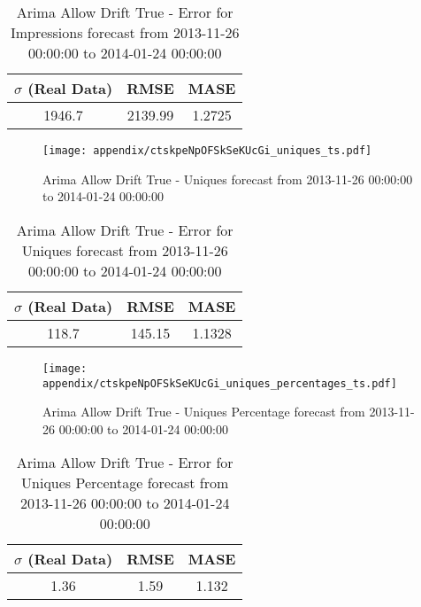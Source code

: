\begin{table}[H]
\centering
\footnotesize
\begin{tabular}{ccc}
$\sigma$ (Real Data) & RMSE & MASE   \\ \hline
1946.7 & 2139.99 & 1.2725 \\
\end{tabular}

\vspace{0.5cm}

\caption{
Arima Allow Drift True - Error for Impressions forecast from 2013-11-26 00:00:00 to 2014-01-24 00:00:00}
\end{table}

\begin{figure}[H] \begin{center} \leavevmode
\texttt{[image: appendix/ctskpeNpOFSkSeKUcGi\_uniques\_ts.pdf]} \caption{
Arima Allow Drift True - Uniques forecast from 2013-11-26 00:00:00 to 2014-01-24 00:00:00} \label{fig:appendix/ctskpeNpOFSkSeKUcGi_uniques_ts.pdf} \end{center}
\end{figure}

\begin{table}[H]
\centering
\footnotesize
\begin{tabular}{ccc}
$\sigma$ (Real Data) & RMSE & MASE   \\ \hline
118.7 & 145.15 & 1.1328 \\
\end{tabular}

\vspace{0.5cm}

\caption{
Arima Allow Drift True - Error for Uniques forecast from 2013-11-26 00:00:00 to 2014-01-24 00:00:00}
\end{table}

\begin{figure}[H] \begin{center} \leavevmode
\texttt{[image: appendix/ctskpeNpOFSkSeKUcGi\_uniques\_percentages\_ts.pdf]} \caption{
Arima Allow Drift True - Uniques Percentage forecast from 2013-11-26 00:00:00 to 2014-01-24 00:00:00} \label{fig:appendix/ctskpeNpOFSkSeKUcGi_uniques_percentages_ts.pdf} \end{center}
\end{figure}

\begin{table}[H]
\centering
\footnotesize
\begin{tabular}{ccc}
$\sigma$ (Real Data) & RMSE & MASE   \\ \hline
1.36 & 1.59 & 1.132 \\
\end{tabular}

\vspace{0.5cm}

\caption{
Arima Allow Drift True - Error for Uniques Percentage forecast from 2013-11-26 00:00:00 to 2014-01-24 00:00:00}
\end{table}

